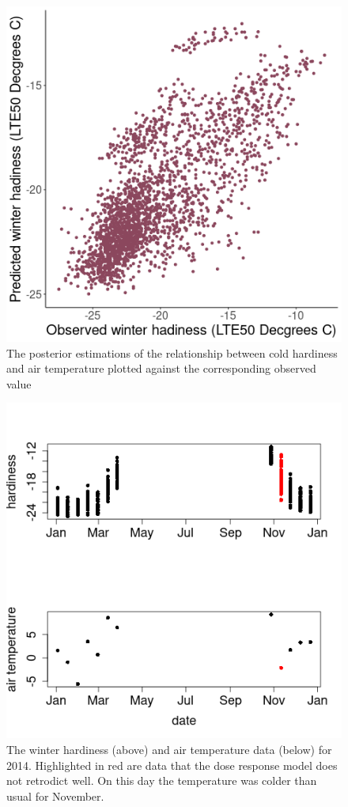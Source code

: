 \documentclass[11pt,letter]{article}
\begin{document}
\begin{figure}
  \includegraphics[scale = 0.5]{PredAgainstReal.png}
  \caption{The posterior estimations of the relationship between cold hardiness and air temperature plotted against the corresponding observed value}
  \label{fig:predAgainstReal}
\end{figure}


\begin{figure}
  \includegraphics[scale = 0.75]{2014Data.png}
  \caption{The winter hardiness (above) and air temperature data (below) for 2014. Highlighted in red are data that the dose response model does not retrodict well. On this day the temperature was colder than usual for November. }
  \label{fig:2014Plot}
\end{figure}
\end{document}
